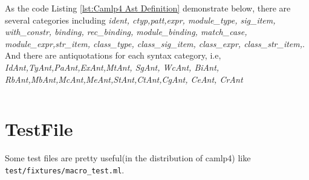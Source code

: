 As the code Listing \ref{lst:Camlp4 Ast Definition} demonstrate below,
there are several categories including \textit{ident, ctyp,patt,expr,
  module\_type, sig\_item, with\_constr, binding, rec\_binding,
  module\_binding, match\_case, module\_expr,str\_item, class\_type,
  class\_sig\_item, class\_expr, class\_str\_item,}. And there are
antiquotations for each syntax category, i.e,
\textit{IdAnt,TyAnt,PaAnt,ExAnt,MtAnt, SgAnt, WcAnt, BiAnt,
  RbAnt,MbAnt,McAnt,MeAnt,StAnt,CtAnt,CgAnt, CeAnt, CrAnt}


\inputminted[fontsize=\scriptsize,
]{ocaml}{code/camlp4/ast/def.ml}


\section{TestFile}
\label{sec:testfile}
Some test files are pretty useful(in the distribution of camlp4)
like \verb|test/fixtures/macro_test.ml|.

